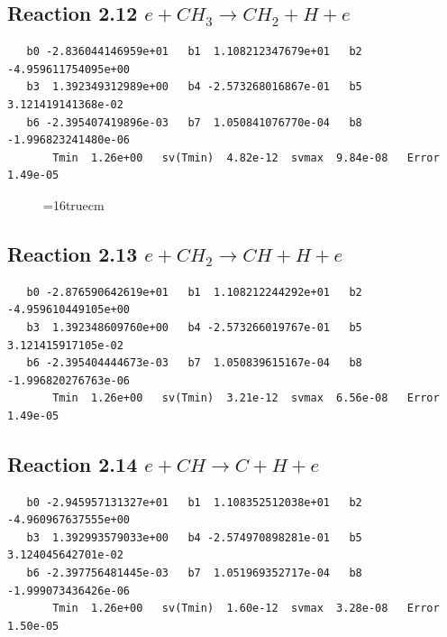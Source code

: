 \documentclass[12pt,dvipdfmx]{article}
\begin{document}
\subsection{
Reaction 2.12      $e + CH_3 \rightarrow CH_2 + H + e $
}

\begin{small}\begin{verbatim}
   b0 -2.836044146959e+01   b1  1.108212347679e+01   b2 -4.959611754095e+00
   b3  1.392349312989e+00   b4 -2.573268016867e-01   b5  3.121419141368e-02
   b6 -2.395407419896e-03   b7  1.050841076770e-04   b8 -1.996823241480e-06
       Tmin  1.26e+00   sv(Tmin)  4.82e-12  svmax  9.84e-08   Error  1.49e-05
\end{verbatim}\end{small}

\begin{figure} \label{met.2_2.11}
\epsfxsize=16truecm
\end{figure}
\newpage

\subsection{
Reaction 2.13     $e + CH_2 \rightarrow CH + H + e $
}

\begin{small}\begin{verbatim}
   b0 -2.876590642619e+01   b1  1.108212244292e+01   b2 -4.959610449105e+00
   b3  1.392348609760e+00   b4 -2.573266019767e-01   b5  3.121415917105e-02
   b6 -2.395404444673e-03   b7  1.050839615167e-04   b8 -1.996820276763e-06
       Tmin  1.26e+00   sv(Tmin)  3.21e-12  svmax  6.56e-08   Error  1.49e-05
\end{verbatim}\end{small}

\subsection{
Reaction 2.14     $e + CH \rightarrow C + H + e $
}

\begin{small}\begin{verbatim}
   b0 -2.945957131327e+01   b1  1.108352512038e+01   b2 -4.960967637555e+00
   b3  1.392993579033e+00   b4 -2.574970898281e-01   b5  3.124045642701e-02
   b6 -2.397756481445e-03   b7  1.051969352717e-04   b8 -1.999073436426e-06
       Tmin  1.26e+00   sv(Tmin)  1.60e-12  svmax  3.28e-08   Error  1.50e-05
\end{verbatim}\end{small}
\end{document}
